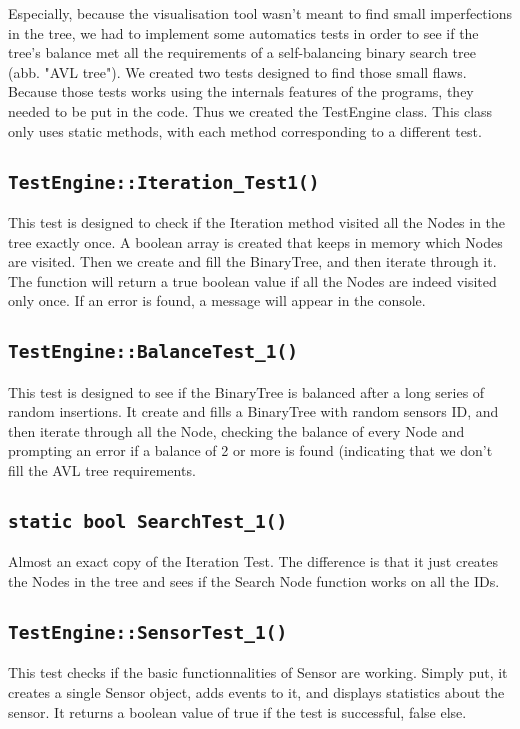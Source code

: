 \documentclass[10pt]{article}
\begin{document}
Especially, because the visualisation tool wasn't meant to find small imperfections in the tree, we had to implement some automatics tests in order to see if the tree's balance met all the requirements of a self-balancing binary search tree (abb. "AVL tree"). We created two tests designed to find those small flaws. Because those tests works using the internals features of the programs, they needed to be put in the code. Thus we created the TestEngine class. This class only uses static methods, with each method corresponding to a different test.

\subsection{\tt TestEngine::Iteration\_Test1()}
This test is designed to check if the Iteration method visited all the Nodes in the tree exactly once. A boolean array is created that keeps in memory which Nodes are visited. Then we create and fill the BinaryTree, and then iterate through it. The function will return a true boolean value if all the Nodes are indeed visited only once. If an error is found, a message will appear in the console.

\subsection{\tt TestEngine::BalanceTest\_1()}
This test is designed to see if the BinaryTree is balanced after a long series of random insertions. It create and fills a BinaryTree with random sensors ID, and then iterate through all the Node, checking the balance of every Node and prompting an error if a balance of 2 or more is found (indicating that we don't fill the AVL tree requirements.

\subsection{\tt static bool SearchTest\_1()}
Almost an exact copy of the Iteration Test. The difference is that it just creates the Nodes in the tree and sees if the Search Node function works on all the IDs.

\subsection{\tt TestEngine::SensorTest\_1()}
This test checks if the basic functionnalities of Sensor are working. Simply put, it creates a single Sensor object, adds events to it, and displays statistics about the sensor. It returns a boolean value of true if the test is successful, false else.
\end{document}

